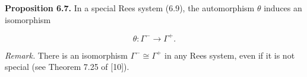 \textbf{Proposition 6.7.} In a special Rees system (6.9), the automorphism $\theta$ induces an isomorphism

$$\theta : \Gamma^{-} \longrightarrow \Gamma^{+}.$$

\textit{Remark.} There is an isomorphism $\Gamma^{-} \cong \Gamma^{+}$ in any Rees system, even if it is not special (see Theorem 7.25 of [10]).

